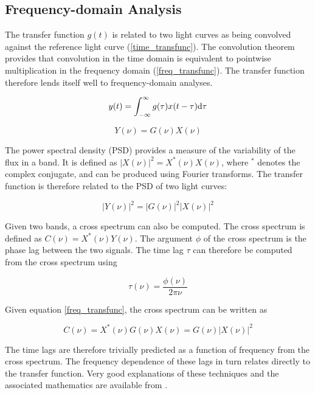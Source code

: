 \documentclass[11pt,letterpaper]{article}
\begin{document}
\subsection{Frequency-domain Analysis}

	The transfer function $g(t)$ is related to two light curves as being convolved against the reference light curve (\ref{time_transfunc}). The convolution theorem provides that convolution in the time domain is equivalent to pointwise multiplication in the frequency domain (\ref{freq_transfunc}). The transfer function therefore lends itself well to frequency-domain analyses.

	\begin{equation}
		\label{time_transfunc}
		y(t) = \int_{-\infty}^{\infty} g(\tau) x(t-\tau)  {\rm d}\tau
	\end{equation}

	\begin{equation}
		\label{freq_transfunc}
		Y(\nu) = G(\nu) X(\nu)
	\end{equation}

    The power spectral density (PSD) provides a measure of the variability of the flux in a band. It is defined as $|X(\nu)|^2 = X^*(\nu)X(\nu)$, where $^*$ denotes the complex conjugate, and can be produced using Fourier transforms. The transfer function is therefore related to the PSD of two light curves:

    \begin{equation}
        |Y(\nu)|^2 = |G(\nu)|^2 |X(\nu)|^2
    \end{equation}

    Given two bands, a cross spectrum can also be computed. The cross spectrum is defined as $C(\nu) = X^*(\nu) Y(\nu)$. The argument $\phi$ of the cross spectrum is the phase lag between the two signals. The time lag $\tau$ can therefore be computed from the cross spectrum using

    \begin{equation}
        \tau(\nu) = \frac{\phi(\nu)}{2\pi\nu}
    \end{equation}

    Given equation \ref{freq_transfunc}, the cross spectrum can be written as

    \begin{equation}
        C(\nu) = X^*(\nu) G(\nu) X(\nu) =  G(\nu) |X(\nu)|^2
    \end{equation}

    The time lags are therefore trivially predicted as a function of frequency from the cross spectrum. The frequency dependence of these lags in turn relates directly to the transfer function. Very good explanations of these techniques and the associated mathematics are available from \cite{2014A&ARv..22...72U}.
\end{document}
